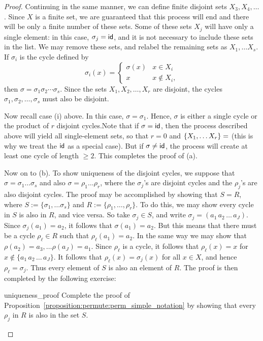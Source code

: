 \begin{proof}
Continuing in
the same manner, we can define finite disjoint sets $X_3, X_4, \ldots$.
Since $X$ is a finite set, we are guaranteed that this process will
end and there will be only a finite number of these sets. Some of these sets $X_j$ will have only a single element: in this case, $\sigma_j= \sf{id}$, and it is 
not necessary to include these sets in the list. We may remove these sets, and relabel the remaining sets as $X_1,\ldots X_s$.  If
$\sigma_i$ is the cycle defined by 
\[
\sigma_i( x )
= \left\{
\begin{array}{ll}
\sigma( x ) & x \in X_i \\
x & x \notin X_i,
\end{array}
\right.
\]
then $\sigma = \sigma_1 \sigma_2 \cdots \sigma_s$. Since the sets
$X_1, X_2, \ldots, X_r$ are disjoint, the cycles $\sigma_1, \sigma_2,
\ldots, \sigma_s$ must also be disjoint.  

Now recall case (i) above. In this case,  $\sigma = \sigma_1$.  Hence, $\sigma$ is either a single cycle or the product of $r$ disjoint cycles.Note that if $\sigma = \sf{id}$, then the process described above will yield all single-element sets, so that $r=0$ and $\{X_1,\ldots X_r\}=\empty$ (this is why we treat the $\sf{id}$ as a special case). But if $\sigma \neq \sf{id}$, the process will create at least one cycle of length $\ge 2$. This completes the proof of (a).


Now on to (b).  To show uniqueness of the disjoint cycles, we suppose that $\sigma = \sigma_1 \ldots \sigma_s$ and also $\sigma = \rho_1 \ldots \rho_r$, where the $\sigma_j$'s are disjoint cycles and the $\rho_j$'s are also disjoint cycles.  The proof may be accomplished by showing that $S = R$, where $S := \{\sigma_1,\ldots \sigma_s \}$ and $R  := \{\rho_1,\ldots,\rho_r\}$. To do this, we may show every cycle in $S$ is also in $R$, and vice versa. So take $\sigma_j \in S$, and write $\sigma_j =(a_1 \, a_2 \, \ldots \, a_J)$. Since $\sigma_j(a_1) = a_2$, it follows that $\sigma(a_1) = a_2$. But this means that there must be a cycle $\rho_\ell \in R$ such that $\rho_\ell(a_1) = a_2$.  In the same way we may show that $\rho(a_2) = a_3, \ldots \rho(a_J)=a_1$. Since $\rho_{\ell}$ is a cycle, it follows that $\rho_{\ell}(x) = x$ for $x \notin \{a_1 \, a_2 \, \ldots \, a_J\}$. It follows that    $\rho_\ell(x) = \sigma_j(x)$ for all $x \in X$, and hence $\rho_\ell = \sigma_j$.  Thus every element of $S$ is also an element of $R$.  The proof is then completed by the following exercise:

\begin{exercise}{uniqueness_proof}
Complete the proof of Proposition~\ref{proposition:permute:perm_simple_notation} by showing that every $\rho_j$ in $R$ is also in the set $S$.
\end{exercise}  

\end{proof}
\medskip



